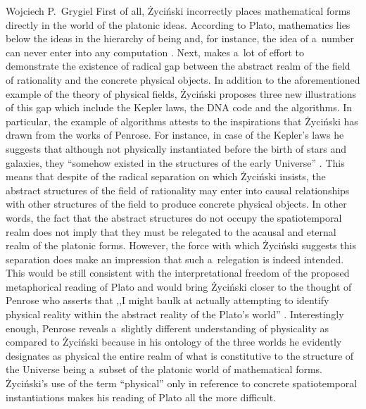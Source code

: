 \begin{artengenv}{Wojciech P.~Grygiel}
First of all, Życiński incorrectly places mathematical forms directly in the world of the platonic ideas. According to Plato, mathematics lies below the ideas in the hierarchy of being and, for instance, the idea of a~number can never enter into any computation
\parencite[][pp.52–60]{shapiro_thinking_2000}. %
 Next, 
\parencite[][]{zycinski_poza_1991} %
 makes a~lot of effort to demonstrate the existence of radical gap between the abstract realm of the field of rationality and the concrete physical objects. In addition to the aforementioned example of the theory of physical fields, Życiński proposes three new illustrations of this gap which include the Kepler laws, the DNA code and the algorithms. In particular, the example of algorithms attests to the inspirations that Życiński has drawn from the works of Penrose. For instance, in case of the Kepler's laws he suggests that although not physically instantiated before the birth of stars and galaxies, they ``somehow existed in the structures of the early Universe'' 
\parencite[][p.71]{zycinski_poza_1991}. %
 This means that despite of the radical separation on which Życiński insists, the abstract structures of the field of rationality may enter into causal relationships with other structures of the field to produce concrete physical objects. In other words, the fact that the abstract structures do not occupy the spatiotemporal realm does not imply that they must be relegated to the acausal and eternal realm of the platonic forms. However, the force with which Życiński suggests this separation does make an impression that such a~relegation is indeed intended. This would be still consistent with the interpretational freedom of the proposed metaphorical reading of Plato and would bring Życiński closer to the thought of Penrose who asserts that ,,I might baulk at actually attempting to identify physical reality within the abstract reality of the Plato's world'' 
\parencite[][p.1029]{penrose_road_2005}. %
 Interestingly enough, Penrose reveals a~slightly different understanding of physicality as compared to Życiński because in his ontology of the three worlds he evidently designates as physical the entire realm of what is constitutive to the structure of the Universe being a~subset of the platonic world of mathematical forms. Życiński's use of the term ``physical'' only in reference to concrete spatiotemporal instantiations makes his reading of Plato all the more difficult.


\end{artengenv}
